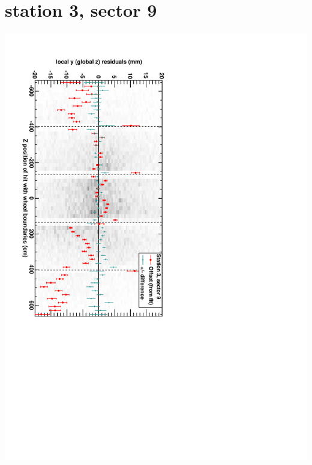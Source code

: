 \documentclass[compress]{beamer}
\begin{document}
\section*{station 3, sector 9}
\begin{frame} \vfill \mbox{\hspace{-1 cm}\includegraphics[height=1.2\linewidth, angle=90]{DTzVsZ_st3_sr09.pdf}} \end{frame}
\end{document}
